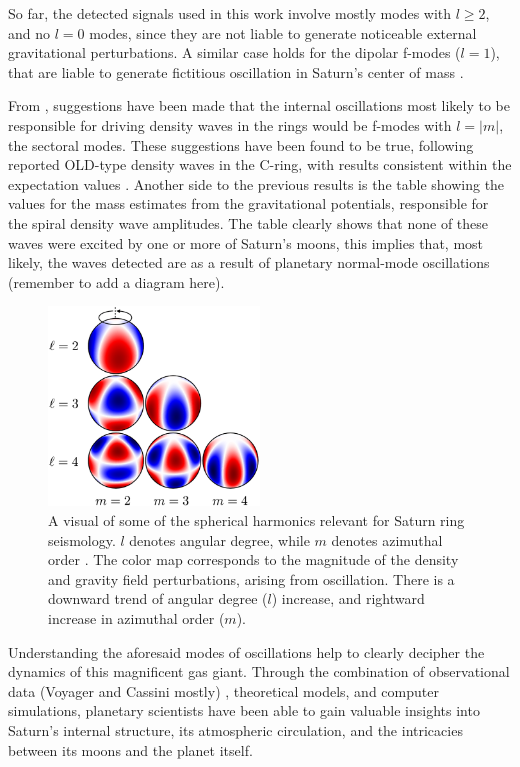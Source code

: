 \documentclass{article}
\begin{document}
So far, the detected signals used in this work involve mostly modes with $l\geq 2$, and no $l=0$ modes, since they are not liable to generate noticeable external gravitational perturbations. A similar case holds for the dipolar f-modes ($l=1$), that are liable to generate fictitious oscillation in Saturn's center of mass \cite{FRENCH2021114660}.






From \cite{FRENCH2021114660, Marley1993PlanetaryAM}, suggestions have been made that the internal oscillations most likely to be responsible for driving density waves in the rings would be f-modes with $l=|m|$, the sectoral modes. These suggestions have been found to be true, following reported OLD-type density waves in the C-ring, with results consistent within the expectation values \cite{Hedman_2013, 10.1093/mnras/stu1503}. Another side to the previous results is the table showing the values for the mass estimates from the gravitational potentials, responsible for the spiral density wave amplitudes. The table clearly shows that none of these waves were excited by one or more of Saturn's moons, this implies that, most likely, the waves detected are as a result of planetary normal-mode oscillations (remember to add a diagram here).
\begin{figure}[h] 
\centering
\includegraphics[width=0.5\textwidth]{mankovitch2.png}
\caption{A visual of some of the spherical harmonics relevant for Saturn ring seismology. $l$ denotes angular degree, while $m$ denotes azimuthal order \cite{Mankovich_2019}.  The color map corresponds to the magnitude of the density and gravity field perturbations, arising from oscillation. There is a downward trend of angular
degree ($l$) increase, and rightward increase in azimuthal order ($m$).} \label{fig:my_label}
\end{figure}

Understanding the aforesaid modes of oscillations help to clearly decipher the dynamics of this magnificent gas giant. Through the combination of observational data (Voyager and Cassini mostly) , theoretical models, and computer simulations, planetary scientists have been able to gain valuable insights into Saturn's internal structure, its atmospheric circulation, and the intricacies between its moons and the planet itself.
\end{document}
